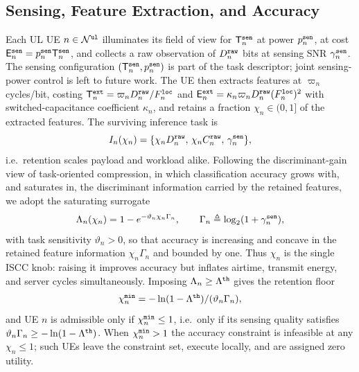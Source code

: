 \documentclass[journal]{IEEEtran}
\begin{document}
\subsection{Sensing, Feature Extraction, and Accuracy}
\label{sec:sense}
Each UL UE $n\in\mathcal{N}^{\tt ul}$ illuminates its field of view for $\mathsf{T}_n^{\tt sen}$ at power $p_n^{\tt sen}$, at cost $\mathsf{E}_n^{\tt sen}=p_n^{\tt sen}\mathsf{T}_n^{\tt sen}$, and collects a raw observation of $D_n^{\tt raw}$ bits at sensing SNR $\gamma_n^{\tt sen}$. The sensing configuration $(\mathsf{T}_n^{\tt sen},p_n^{\tt sen})$ is part of the task descriptor; joint sensing-power control is left to future work. The UE then extracts features at $\varpi_n$ cycles/bit, costing $\mathsf{T}_n^{\tt ext}=\varpi_n D_n^{\tt raw}/F_n^{\tt loc}$ and $\mathsf{E}_n^{\tt ext}=\kappa_n\varpi_n D_n^{\tt raw}(F_n^{\tt loc})^2$ with switched-capacitance coefficient $\kappa_n$, and retains a fraction $\chi_n\in(0,1]$ of the extracted features. The surviving inference task is
\begin{equation}
I_n(\chi_n)=\{\chi_n D_n^{\tt raw},\,\chi_n C_n^{\tt raw},\,\gamma_n^{\tt sen}\},
\label{eq:task}
\end{equation}
i.e.\ retention scales payload and workload alike. Following the discriminant-gain view of task-oriented compression, in which classification accuracy grows with, and saturates in, the discriminant information carried by the retained features, we adopt the saturating surrogate
\begin{equation}
\Lambda_n(\chi_n)=1-e^{-\vartheta_n\chi_n \Gamma_n},
\qquad
\Gamma_n\triangleq\log_2(1+\gamma_n^{\tt sen}),
\label{eq:acc}
\end{equation}
with task sensitivity $\vartheta_n>0$, so that accuracy is increasing and concave in the retained feature information $\chi_n\Gamma_n$ and bounded by one. Thus $\chi_n$ is the single ISCC knob: raising it improves accuracy but inflates airtime, transmit energy, and server cycles simultaneously. Imposing $\Lambda_n\ge\Lambda^{\tt th}$ gives the retention floor
\begin{equation}
\chi_n^{\tt min}=-\ln(1-\Lambda^{\tt th})/(\vartheta_n \Gamma_n),
\label{eq:chimin}
\end{equation}
and UE $n$ is admissible only if $\chi_n^{\tt min}\le 1$, i.e.\ only if its sensing quality satisfies $\vartheta_n \Gamma_n\ge-\ln(1-\Lambda^{\tt th})$. When $\chi_n^{\tt min}>1$ the accuracy constraint is infeasible at any $\chi_n\le1$; such UEs leave the constraint set, execute locally, and are assigned zero utility.
\end{document}
